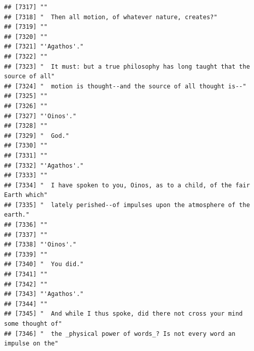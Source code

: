 \documentclass{article}\usepackage[]{graphicx}\usepackage[]{color}
\makeatletter
\newenvironment{kframe}{%
 \def\at@end@of@kframe{}%
 \ifinner\ifhmode%
  \def\at@end@of@kframe{\end{minipage}}%
  \begin{minipage}{\columnwidth}%
 \fi\fi%
 \def\FrameCommand##1{\hskip\@totalleftmargin \hskip-\fboxsep
 \colorbox{shadecolor}{##1}\hskip-\fboxsep
     \hskip-\linewidth \hskip-\@totalleftmargin \hskip\columnwidth}%
 \MakeFramed {\advance\hsize-\width
   \@totalleftmargin\z@ \linewidth\hsize
   \@setminipage}}%
 {\par\unskip\endMakeFramed%
 \at@end@of@kframe}
\newenvironment{knitrout}{}{} %
\makeatother
\begin{document}
\begin{knitrout}
\begin{kframe}
\begin{verbatim}
## [7317] ""                                                                            
## [7318] "  Then all motion, of whatever nature, creates?"                             
## [7319] ""                                                                            
## [7320] ""                                                                            
## [7321] "'Agathos'."                                                                  
## [7322] ""                                                                            
## [7323] "  It must: but a true philosophy has long taught that the source of all"     
## [7324] "  motion is thought--and the source of all thought is--"                     
## [7325] ""                                                                            
## [7326] ""                                                                            
## [7327] "'Oinos'."                                                                    
## [7328] ""                                                                            
## [7329] "  God."                                                                      
## [7330] ""                                                                            
## [7331] ""                                                                            
## [7332] "'Agathos'."                                                                  
## [7333] ""                                                                            
## [7334] "  I have spoken to you, Oinos, as to a child, of the fair Earth which"       
## [7335] "  lately perished--of impulses upon the atmosphere of the earth."            
## [7336] ""                                                                            
## [7337] ""                                                                            
## [7338] "'Oinos'."                                                                    
## [7339] ""                                                                            
## [7340] "  You did."                                                                  
## [7341] ""                                                                            
## [7342] ""                                                                            
## [7343] "'Agathos'."                                                                  
## [7344] ""                                                                            
## [7345] "  And while I thus spoke, did there not cross your mind some thought of"     
## [7346] "  the _physical power of words_? Is not every word an impulse on the"        

\end{verbatim}
\end{kframe}
\end{knitrout}
\end{document}
